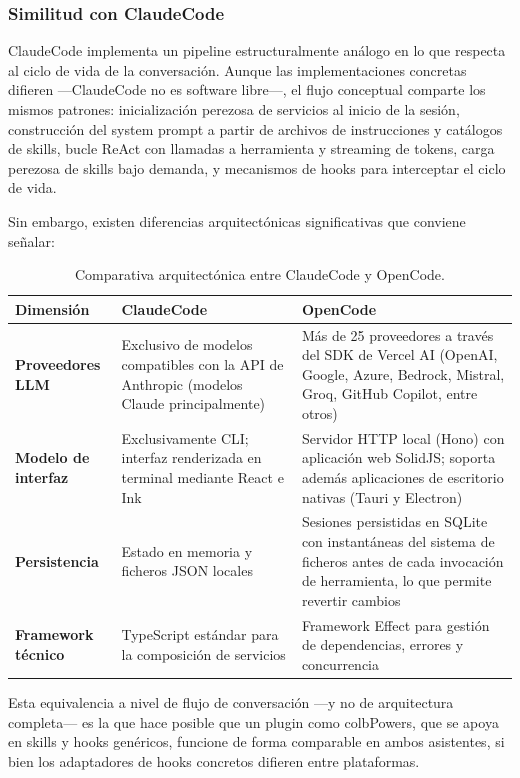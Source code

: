 \documentclass[11pt, letterpaper]{article}
\begin{document}
\subsubsection{Similitud con ClaudeCode}
ClaudeCode implementa un pipeline estructuralmente análogo en lo que respecta al ciclo de vida de la conversación. Aunque las implementaciones concretas difieren ---ClaudeCode no es software libre---, el flujo conceptual comparte los mismos patrones: inicialización perezosa de servicios al inicio de la sesión, construcción del system prompt a partir de archivos de instrucciones y catálogos de skills, bucle ReAct con llamadas a herramienta y streaming de tokens, carga perezosa de skills bajo demanda, y mecanismos de hooks para interceptar el ciclo de vida.

Sin embargo, existen diferencias arquitectónicas significativas que conviene señalar:

\begin{table}[H]
\centering
\begin{tabular}{p{2.8cm} p{4.5cm} p{7cm}}
\toprule
\textbf{Dimensión} & \textbf{ClaudeCode} & \textbf{OpenCode} \\
\midrule
\textbf{Proveedores LLM} & Exclusivo de modelos compatibles con la API de Anthropic (modelos Claude principalmente) & Más de 25 proveedores a través del SDK de Vercel AI (OpenAI, Google, Azure, Bedrock, Mistral, Groq, GitHub Copilot, entre otros) \\
\textbf{Modelo de interfaz} & Exclusivamente CLI; interfaz renderizada en terminal mediante React e Ink & Servidor HTTP local (Hono) con aplicación web SolidJS; soporta además aplicaciones de escritorio nativas (Tauri y Electron) \\
\textbf{Persistencia} & Estado en memoria y ficheros JSON locales & Sesiones persistidas en SQLite con instantáneas del sistema de ficheros antes de cada invocación de herramienta, lo que permite revertir cambios \\
\textbf{Framework técnico} & TypeScript estándar para la composición de servicios & Framework Effect para gestión de dependencias, errores y concurrencia \\
\bottomrule
\end{tabular}
\caption{Comparativa arquitectónica entre ClaudeCode y OpenCode.}
\label{tab:comparativa_asistentes}
\end{table}

Esta equivalencia a nivel de flujo de conversación ---y no de arquitectura completa--- es la que hace posible que un plugin como colbPowers, que se apoya en skills y hooks genéricos, funcione de forma comparable en ambos asistentes, si bien los adaptadores de hooks concretos difieren entre plataformas.
\end{document}
